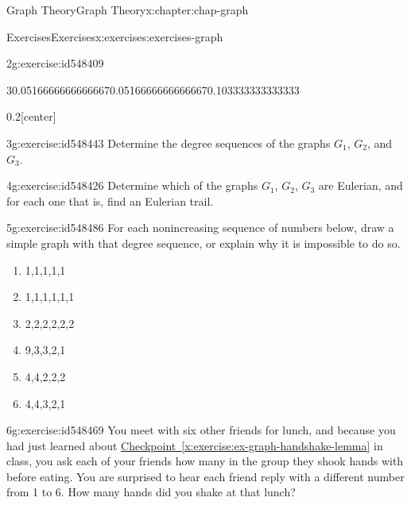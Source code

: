 \documentclass[oneside,10pt,]{book}
\newcommand{\xreffont}{\relax}
\numberwithin{equation}{section}
\begin{document}
\begin{chapterptx}{Graph Theory}{}{Graph Theory}{}{}{x:chapter:chap-graph}
\begin{exercises-section}{Exercises}{}{Exercises}{}{}{x:exercises:exercises-graph}
\begin{divisionexercise}{2}{}{}{g:exercise:id548409}
\begin{sidebyside}{3}{0.0516666666666667}{0.0516666666666667}{0.103333333333333}
\begin{sbspanel}{0.2}[center]
{
}%
\end{sbspanel}%
\end{sidebyside}%
\end{divisionexercise}%
\begin{divisionexercise}{3}{}{}{g:exercise:id548443}%
Determine the degree sequences of the graphs \(G_1\), \(G_2\), and \(G_3\).%
\end{divisionexercise}%
\begin{divisionexercise}{4}{}{}{g:exercise:id548426}%
Determine which of the graphs \(G_1\), \(G_2\), \(G_3\) are Eulerian, and for each one that is, find an Eulerian trail.%
\end{divisionexercise}%
\begin{divisionexercise}{5}{}{}{g:exercise:id548486}%
For each nonincreasing sequence of numbers below, draw a simple graph with that degree sequence, or explain why it is impossible to do so.%
\begin{enumerate}[label=(\alph*)]
\item{}1,1,1,1,1%
\item{}1,1,1,1,1,1%
\item{}2,2,2,2,2,2%
\item{}9,3,3,2,1%
\item{}4,4,2,2,2%
\item{}4,4,3,2,1%
\end{enumerate}
%
\end{divisionexercise}%
\begin{divisionexercise}{6}{}{}{g:exercise:id548469}%
You meet with six other friends for lunch, and because you had just learned about \hyperref[x:exercise:ex-graph-handshake-lemma]{Checkpoint~{\xreffont\ref{x:exercise:ex-graph-handshake-lemma}}} in class, you ask each of your friends how many in the group they shook hands with before eating. You are surprised to hear each friend reply with a different number from 1 to 6. How many hands did you shake at that lunch?%

\end{divisionexercise}
\end{exercises-section}
\end{chapterptx}
\end{document}
